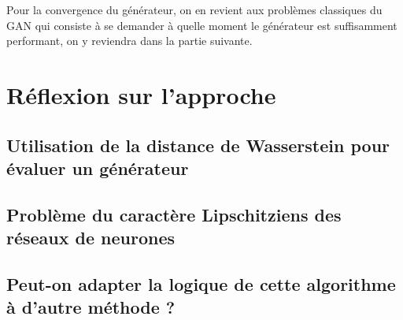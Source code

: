  Pour la convergence du générateur, on en revient aux problèmes classiques du GAN qui consiste à se demander à quelle moment le générateur est suffisamment performant, on y reviendra dans la partie suivante.

 \section{Réflexion sur l'approche}

 \subsection{Utilisation de la distance de Wasserstein pour évaluer un générateur}
 \subsection{Problème du caractère Lipschitziens des réseaux de neurones}
 \subsection{Peut-on adapter la logique de cette algorithme à d'autre méthode ?}